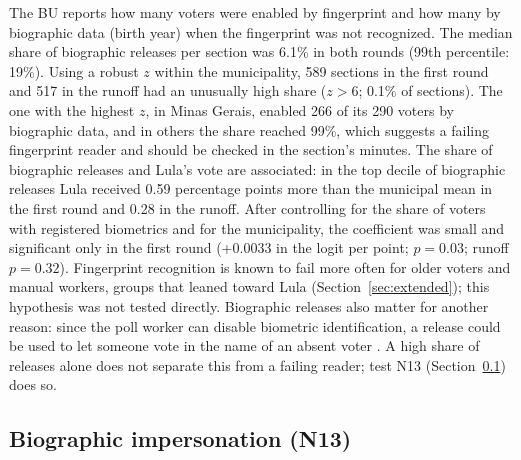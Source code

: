 The BU reports how many voters were enabled by fingerprint and how many by
biographic data (birth year) when the fingerprint was not recognized. The
median share of biographic releases per section was 6.1\% in both rounds
(99th percentile: 19\%). Using a robust $z$ within the municipality, 589
sections in the first round and 517 in the runoff had an unusually high
share ($z>6$; 0.1\% of sections). The one with the highest $z$, in Minas
Gerais, enabled 266 of its 290 voters by biographic data, and in others the
share reached 99\%, which suggests a failing
fingerprint reader and should be checked in the section's minutes. The
share of biographic releases and Lula's vote are associated: in the top
decile of biographic releases Lula received 0.59 percentage points more than
the municipal mean in the first round and 0.28 in the runoff. After
controlling for the share of voters with registered biometrics and for the
municipality, the coefficient was small and significant only in the first
round (+0.0033 in the logit per point; $p=0.03$; runoff $p=0.32$).
Fingerprint recognition is known to fail more often for older voters and
manual workers, groups that leaned toward Lula (Section~\ref{sec:extended});
this hypothesis was not tested directly. Biographic releases also matter for
another reason: since the poll worker can disable biometric identification,
a release could be used to let someone vote in the name of an absent voter
\cite{vandegraaf2017}. A high share of releases alone does not separate this
from a failing reader; test N13 (Section~\ref{sec:n13}) does so.

\subsection{Biographic impersonation (N13)}
\label{sec:n13}

